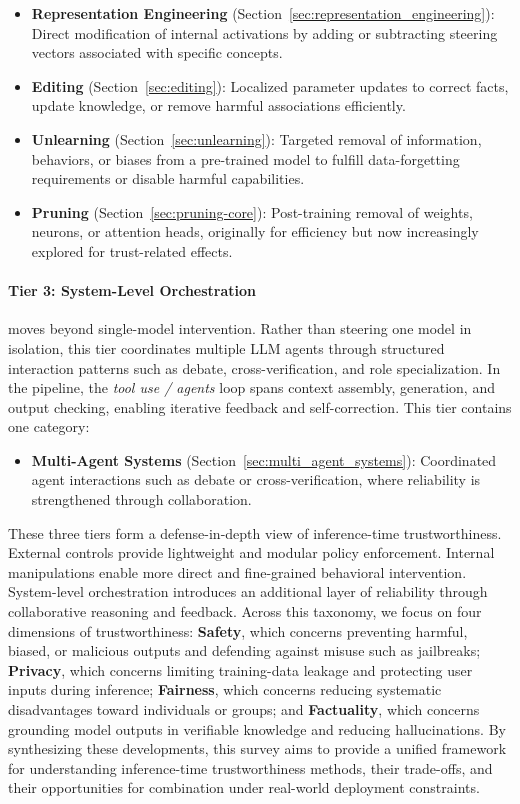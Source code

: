 \begin{itemize}
\item \textbf{Representation Engineering} (Section~\ref{sec:representation_engineering}): Direct modification of internal activations by adding or subtracting steering vectors associated with specific concepts.
\item \textbf{Editing} (Section~\ref{sec:editing}): Localized parameter updates to correct facts, update knowledge, or remove harmful associations efficiently.
\item \textbf{Unlearning} (Section~\ref{sec:unlearning}): Targeted removal of information, behaviors, or biases from a pre-trained model to fulfill data-forgetting requirements or disable harmful capabilities.
\item \textbf{Pruning} (Section~\ref{sec:pruning-core}): Post-training removal of weights, neurons, or attention heads, originally for efficiency but now increasingly explored for trust-related effects.
\end{itemize}

\paragraph{Tier 3: System-Level Orchestration} moves beyond single-model intervention. Rather than steering one model in isolation, this tier coordinates multiple LLM agents through structured interaction patterns such as debate, cross-verification, and role specialization. In the pipeline, the \emph{tool use / agents} loop spans context assembly, generation, and output checking, enabling iterative feedback and self-correction. This tier contains one category:

\begin{itemize}
\item \textbf{Multi-Agent Systems} (Section~\ref{sec:multi_agent_systems}): Coordinated agent interactions such as debate or cross-verification, where reliability is strengthened through collaboration.
\end{itemize}

These three tiers form a defense-in-depth view of inference-time trustworthiness. External controls provide lightweight and modular policy enforcement. Internal manipulations enable more direct and fine-grained behavioral intervention. System-level orchestration introduces an additional layer of reliability through collaborative reasoning and feedback. Across this taxonomy, we focus on four dimensions of trustworthiness: \textbf{Safety}, which concerns preventing harmful, biased, or malicious outputs and defending against misuse such as jailbreaks; \textbf{Privacy}, which concerns limiting training-data leakage and protecting user inputs during inference; \textbf{Fairness}, which concerns reducing systematic disadvantages toward individuals or groups; and \textbf{Factuality}, which concerns grounding model outputs in verifiable knowledge and reducing hallucinations. By synthesizing these developments, this survey aims to provide a unified framework for understanding inference-time trustworthiness methods, their trade-offs, and their opportunities for combination under real-world deployment constraints.

